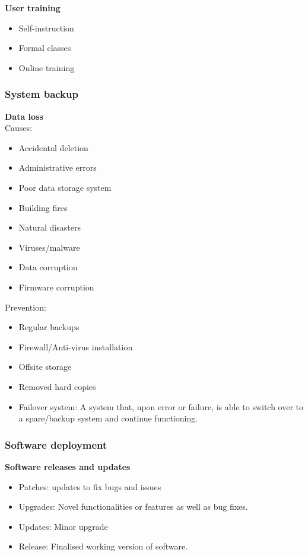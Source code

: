 \documentclass{article}
\begin{document}
\textbf{User training}
\begin{itemize}
    \item Self-instruction
    \item Formal classes
    \item Online training
\end{itemize}

\subsubsection{System backup}

\textbf{Data loss} \\
Causes:
\begin{itemize}
    \item Accidental deletion
    \item Administrative errors
    \item Poor data storage system
    \item Building fires
    \item Natural disasters
    \item Viruses/malware
    \item Data corruption
    \item Firmware corruption
\end{itemize}

Prevention:
\begin{itemize}
    \item Regular backups
    \item Firewall/Anti-virus installation
    \item Offsite storage
    \item Removed hard copies
    \item Failover system: A system that, upon error or failure, is able to switch over
        to a spare/backup system and continue functioning.
\end{itemize}

\subsubsection{Software deployment}

\textbf{Software releases and updates}
\begin{itemize}
    \item Patches: updates to fix bugs and issues
    \item Upgrades: Novel functionalities or features as well as bug fixes.
    \item Updates: Minor upgrade
    \item Release: Finalised working version of software.
\end{itemize}
\end{document}
